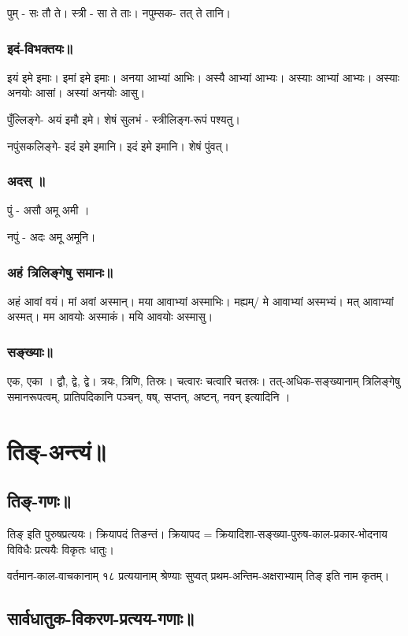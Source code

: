 \documentclass[oneside, article]{memoir}
\begin{document}
पुम् - सः तौ ते। स्त्री - सा ते ताः। नपुम्सक- तत् ते तानि।

\subsection{इदं-विभक्तयः॥}
इयं इमे इमाः। इमां इमे इमाः। अनया आभ्यां आभिः। अस्यै आभ्यां आभ्यः। अस्याः आभ्यां आभ्यः। अस्याः अनयोः आसां। अस्यां अनयोः आसु।

पुँल्लिङ्गे- अयं इमौ इमे। शेषं सुलभं - स्त्रीलिङ्ग-रूपं पश्यतु।

नपुंसकलिङ्गे- इदं इमे इमानि। इदं इमे इमानि। शेषं पुंवत्।

\subsection{अदस् ॥}
पुं - असौ अमू अमी । 

नपुं - अदः अमू अमूनि।

\subsection{अहं त्रिलिङ्गेषु समानः॥}
अहं आवां वयं। मां अवां अस्मान्। मया आवाभ्यां अस्माभिः। मह्यम्/ मे आवाभ्यां अस्मभ्यं। मत् आवाभ्यां अस्मत्। मम आवयोः अस्माकं। मयि आवयोः अस्मासु।

\subsection{सङ्ख्याः॥}
एक, एका । द्वौ, द्वे, द्वे। त्रयः, त्रिणि, तिस्रः। चत्वारः चत्वारि चतस्रः। तत्-अधिक-सङ्ख्यानाम् त्रिलिङ्गेषु समानरूपत्वम्, प्रातिपदिकानि पञ्चन्, षष्, सप्तन्, अष्टन्, नवन् इत्यादिनि ।

\chapter{तिङ्-अन्त्यं॥}
\section{तिङ्-गणः॥}
तिङ् इति पुरुषप्रत्ययः। क्रियापदं तिङन्तं। क्रियापद = क्रियादिशा-सङ्ख्या-पुरुष-काल-प्रकार-भोदनाय विविधैः प्रत्ययैः विकृतः धातुः।

वर्तमान-काल-वाचकानाम् १८ प्रत्ययानाम् श्रेण्याः सुप्वत् प्रथम-अन्तिम-अक्षराभ्याम् तिङ् इति नाम कृतम्।

\section{सार्वधातुक-विकरण-प्रत्यय-गणाः॥}
\end{document}
